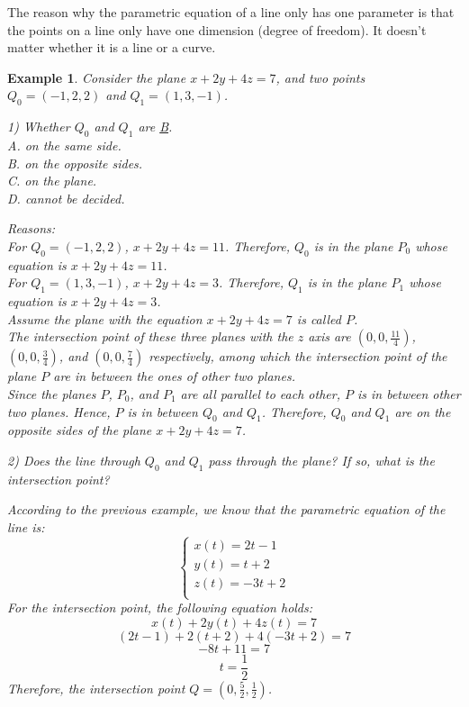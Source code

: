 \documentclass{article}
\newtheorem{example}{Example}
\begin{document}
The reason why the parametric equation of a line only has one parameter is that 
the points on a line only have one dimension (degree of freedom). It doesn't 
matter whether it is a line or a curve.

\begin{example}
  Consider the plane $x + 2y + 4z = 7$, and two points $Q_0 = (-1, 2, 2)$ and 
  $Q_1 = (1, 3, -1)$.

  1) Whether $Q_0$ and $Q_1$ are \underline{B}. \\
  A. on the same side. \\
  B. on the opposite sides. \\
  C. on the plane. \\
  D. cannot be decided.

  Reasons: \\
  For $Q_0 = (-1, 2, 2)$, $x + 2y + 4z = 11$. Therefore, $Q_0$ is in the plane 
  $P_0$ whose equation is $x + 2y + 4z = 11$. \\
  For $Q_1 = (1, 3, -1)$, $x + 2y + 4z = 3$. Therefore, $Q_1$ is in the plane 
  $P_1$ whose equation is $x + 2y + 4z = 3$. \\
  Assume the plane with the equation $x + 2y + 4z = 7$ is called $P$. \\
  The intersection point of these three planes with the $z$ axis are 
  $(0, 0, \frac{11}{4})$, $(0, 0, \frac{3}{4})$, and $(0, 0, \frac{7}{4})$ 
  respectively, among which the intersection point of the plane $P$ are in 
  between the ones of other two planes. \\
  Since the planes $P$, $P_0$, and $P_1$ are all parallel to each other, $P$ is 
  in between other two planes. Hence, $P$ is in between $Q_0$ and $Q_1$. 
  Therefore, $Q_0$ and $Q_1$ are on the opposite sides of the plane 
  $x + 2y + 4z = 7$.

  \bigskip

  2) Does the line through $Q_0$ and $Q_1$ pass through the plane? If so, what 
  is the intersection point?

  According to the previous example, we know that the parametric equation of the 
  line is:
  \[
    \left\{ \begin{array}{ll}
    x(t) = 2t - 1 \\
    y(t) = t + 2 \\
    z(t) = -3t + 2 \\
    \end{array} \right.
  \]
  For the intersection point, the following equation holds:
  \[
    x(t) + 2y(t) + 4z(t) = 7
  \]
  \[
    (2t - 1) + 2(t + 2) + 4(-3t + 2) = 7
  \]
  \[
    -8t + 11 = 7
  \]
  \[
    t = \frac{1}{2}
  \]
  Therefore, the intersection point $Q = (0, \frac{5}{2}, \frac{1}{2})$.


\end{example}
\end{document}
